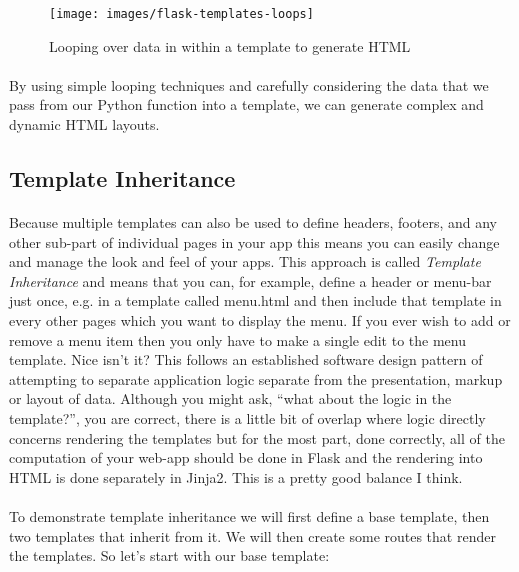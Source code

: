 \documentclass[12pt, a4paper, oneside]{book}
\begin{document}
{\begin{figure}[H]
\centering
\texttt{[image: images/flask-templates-loops]}
\caption{Looping over data in within a template to generate HTML}
\label{fig:flask-templates-loops}
\end{figure}

\paragraph{} By using simple looping techniques and carefully considering the data that we pass from our Python function into a template, we can generate complex and dynamic HTML layouts.


\subsection{Template Inheritance}
\label{template-inheritance}
\paragraph{} Because multiple templates can also be used to define headers, footers, and any other sub-part of individual pages in your app this means you can easily change and manage the look and feel of your apps. This approach is called \emph{Template Inheritance} and means that you can, for example, define a header or menu-bar just once, e.g. in a template called menu.html and then include that template in every other pages which you want to display the menu. If you ever wish to add or remove a menu item then you only have to make a single edit to the menu template. Nice isn't it? This follows an established software design pattern of attempting to separate application logic separate from the presentation, markup or layout of data. Although you might ask, ``what about the logic in the template?'', you are correct, there is a little bit of overlap where logic directly concerns rendering the templates but for the most part, done correctly, all of the computation of your web-app should be done in Flask and the rendering into HTML is done separately in Jinja2. This is a pretty good balance I think.

\paragraph{} To demonstrate template inheritance we will first define a base template, then two templates that inherit from it. We will then create some routes that render the templates. So let's start with our base template:

}
\end{document}
